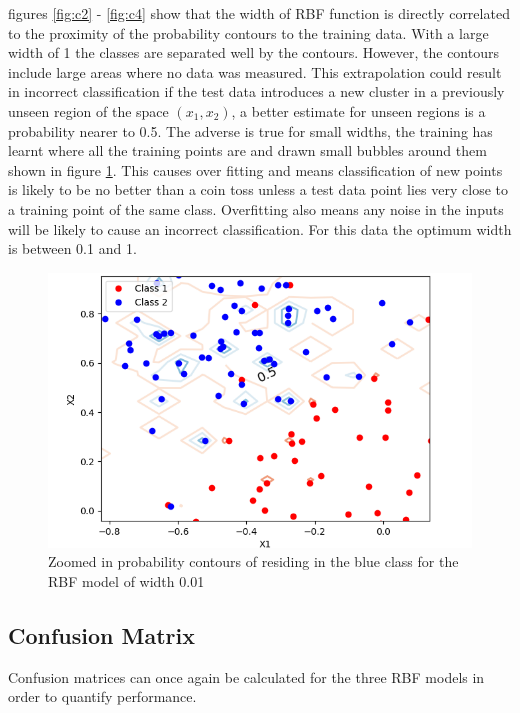 \documentclass[twoside,twocolumn]{article}
\begin{document}
figures \ref{fig:c2} - \ref{fig:c4} show that the width of RBF function is directly correlated to the proximity of the probability contours to the training data. With a large width of 1 the classes are separated well by the contours. However, the contours include large areas where no data was measured. This extrapolation could result in incorrect classification if the test data introduces a new cluster in a previously unseen region of the space $(x_1,x_2)$, a better estimate for unseen regions is a probability nearer to 0.5. The adverse is true for small widths, the training has learnt where all the training points are and drawn small bubbles around them shown in figure \ref{fig:c5}. This causes over fitting and means classification of new points is likely to be no better than a coin toss unless a test data point lies very close to a training point of the same class. Overfitting also means any noise in the inputs will be likely to cause an incorrect classification. For this data the optimum width is between 0.1 and 1.
\begin{figure}[h]
  \centering
    \includegraphics[width=\linewidth]{l=0-01contourzoom}
  \caption{Zoomed in probability contours of residing in the blue class for the RBF model of width 0.01}
  \label{fig:c5}
\end{figure}
\subsection{Confusion Matrix}
Confusion matrices can once again be calculated for the three RBF models in order to quantify performance. 
\newline 
\end{document}
